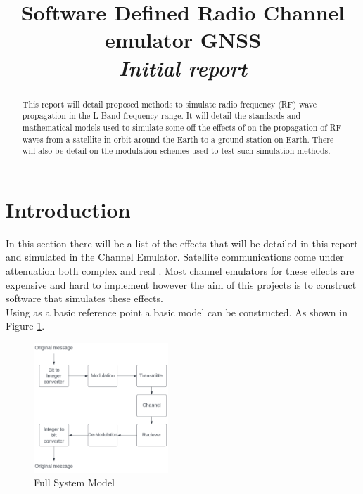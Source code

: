 \documentclass[conference]{IEEEtran}
\begin{document}
\title{Software Defined Radio Channel emulator GNSS\\ \large{\textit{Initial report}}}

\author{
}

\maketitle
\begin{abstract}
This report will detail proposed methods to simulate radio frequency (RF) wave propagation in the L-Band frequency range. It will detail the standards and mathematical models used to simulate some off the effects of on the propagation of RF waves from a satellite in orbit around the Earth to a ground station on Earth. There will also be detail on the modulation schemes used to test such simulation methods.
\end{abstract}

\section{Introduction}
In this section there will be a list of the effects that will be detailed in this report and simulated in the Channel Emulator. Satellite communications come under attenuation both complex and real \cite{seybold_introduction_2005}. Most channel emulators for these effects are expensive and hard to implement however the aim of this projects is to construct software that simulates these effects.\\

Using \cite{seybold_introduction_2005} as a basic reference point a basic model can be constructed. As shown in Figure \ref{fig:System_model}. 
\begin{figure}[h]
\centering
	\includegraphics[width = 0.45\textwidth]{System_model.png}
	\caption{Full System Model}
	\label{fig:System_model}
\end{figure}
\end{document}
